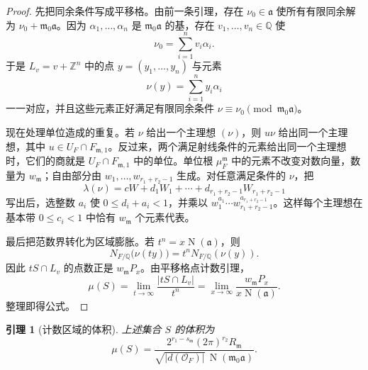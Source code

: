 \documentclass[11pt,a4paper,openany]{ctexbook}
\numberwithin{equation}{chapter}
\newcommand{\Q}{\mathbb{Q}}
\newcommand{\Z}{\mathbb{Z}}
\newcommand{\OF}{\mathcal{O}_F}
\newcommand{\Nm}{\operatorname{N}}
\theoremstyle{plain}
\newtheorem{lemma}[theorem]{引理}
\theoremstyle{definition}
\theoremstyle{remark}
\begin{document}
\begin{proof}
先把同余条件写成平移格。由前一条引理，存在
$\nu_0\in\mathfrak a$ 使所有有限同余解为
$\nu_0+\mathfrak m_0\mathfrak a$。因为
$\alpha_1,\dots,\alpha_n$ 是 $\mathfrak m_0\mathfrak a$ 的基，存在
$v_1,\dots,v_n\in\Q$ 使
\[
\nu_0=\sum_{i=1}^n v_i\alpha_i .
\]
于是 $L_v=v+\Z^n$ 中的点 $y=(y_1,\dots,y_n)$ 与元素
\[
\nu(y)=\sum_{i=1}^n y_i\alpha_i
\]
一一对应，并且这些元素正好满足有限同余条件
$\nu\equiv\nu_0\pmod{\mathfrak m_0\mathfrak a}$。

现在处理单位造成的重复。若 $\nu$ 给出一个主理想 $(\nu)$，则
$u\nu$ 给出同一个主理想，其中 $u\in U_F\cap F_{\mathfrak m,1}$。反过来，两个满足射线条件的元素给出同一个主理想时，它们的商就是
$U_F\cap F_{\mathfrak m,1}$ 中的单位。单位根
\(\mu_F^{\mathfrak m}\) 中的元素不改变对数向量，数量为 $w_{\mathfrak m}$；自由部分由
$w_1,\dots,w_{r_1+r_2-1}$ 生成。对任意满足条件的 $\nu$，把
\[
\lambda(\nu)=cW+d_1W_1+\cdots+d_{r_1+r_2-1}W_{r_1+r_2-1}
\]
写出后，选整数 $a_i$ 使 $0\le d_i+a_i<1$，并乘以
$w_1^{a_1}\cdots w_{r_1+r_2-1}^{a_{r_1+r_2-1}}$。这样每个主理想在基本带
$0\le c_i<1$ 中恰有 $w_{\mathfrak m}$ 个元素代表。

最后把范数界转化为区域膨胀。若 $t^n=x\Nm(\mathfrak a)$，则
\[
N_{F/\Q}\bigl(\nu(ty)\bigr)=t^nN_{F/\Q}(\nu(y)).
\]
因此 $tS\cap L_v$ 的点数正是 $w_{\mathfrak m}P_x$。由平移格点计数引理，
\[
\mu(S)=\lim_{t\to\infty}\frac{|tS\cap L_v|}{t^n}
=\lim_{x\to\infty}\frac{w_{\mathfrak m}P_x}{x\Nm(\mathfrak a)}.
\]
整理即得公式。
\end{proof}

\begin{lemma}[计数区域的体积]
上述集合 $S$ 的体积为
\[
\mu(S)=
\frac{2^{r_1-s_{\mathfrak m}}(2\pi)^{r_2}R_{\mathfrak m}}
{\sqrt{|d(\OF)|}\,\Nm(\mathfrak m_0\mathfrak a)}.
\]
\end{lemma}
\end{document}
